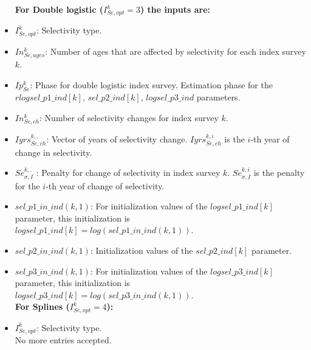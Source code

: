 \documentclass{article}
\begin{document}
\begin{itemize}
    \textbf{For Double logistic 
 ($I_{Se,opt}^k=3$) the inputs are:}\\
    \item $I_{Se,opt}^k$: Selectivity type.
    \item $In_{Se,ages}^k$: Number of ages that are affected by selectivity for each index survey $k$.
    \item $Ip_{Se}^k$: Phase for double logistic index survey. Estimation phase for the $r logsel\_p1\_ind[k]$, $sel\_p2\_ind[k]$,
    $logsel\_p3\_ind$ parameters.
    \item $In_{Se,ch}^k$: Number of selectivity changes for index survey $k$.
    \item $Iyrs_{Se,ch}^{k,.}$: Vector of years of selectivity change. $Iyrs_{Se,ch}^{k,i}$ is the $i$-th year of change in selectivity. 
    \item $Se_{\sigma,I}^{k,.}$ : Penalty for change of selectivity in index survey $k$.  $Se_{\sigma,I}^{k,i}$ is the penalty for the $i$-th year of change of selectivity.
    \item $sel\_p1\_in\_ind(k,1)$: For initialization values of the $logsel\_p1\_ind[k]$ parameter, this initialization is $logsel\_p1\_ind[k]=log(sel\_p1\_in\_ind(k,1))$.
    \item $sel\_p2\_in\_ind(k,1)$: Initialization values of the $sel\_p2\_ind[k]$ parameter.
    \item $sel\_p3\_in\_ind(k,1)$:  For initialization values of the $logsel\_p3\_ind[k]$ parameter, this initialization is $logsel\_p3\_ind[k]=log(sel\_p3\_in\_ind(k,1))$.\\
    
     \textbf{For Splines ($I_{Se,opt}^k=4$):}\\
    \item $I_{Se,opt}^k$: Selectivity type.\\
    
    No more entries accepted.\\


\end{itemize}
\end{document}
